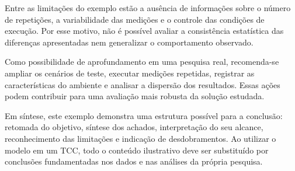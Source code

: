 Entre as limitações do exemplo estão a ausência de informações sobre o número de repetições,
a variabilidade das medições e o controle das condições de execução. Por esse motivo, não é
possível avaliar a consistência estatística das diferenças apresentadas nem generalizar o
comportamento observado.

Como possibilidade de aprofundamento em uma pesquisa real, recomenda-se ampliar os cenários
de teste, executar medições repetidas, registrar as características do ambiente e analisar a
dispersão dos resultados. Essas ações podem contribuir para uma avaliação mais robusta
da solução estudada.

Em síntese, este exemplo demonstra uma estrutura possível para a conclusão: retomada do objetivo,
síntese dos achados, interpretação do seu alcance, reconhecimento das limitações e indicação de
desdobramentos. Ao utilizar o modelo em um TCC, todo o conteúdo ilustrativo deve ser substituído
por conclusões fundamentadas nos dados e nas análises da própria pesquisa.


%
